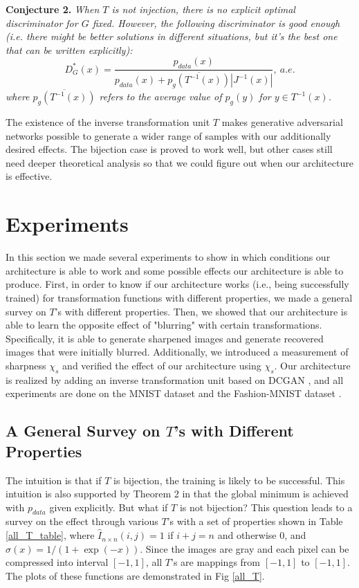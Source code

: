 \documentclass{article}
\begin{document}
\textbf{Conjecture 2.} \emph{When $T$ is not injection, there is no explicit optimal discriminator for $G$ fixed. However, the following discriminator is good enough (i.e. there might be better solutions in different situations, but it's the best one that can be written explicitly):
\begin{equation}D_G^*(x)=\frac{p_{data}(x)}{p_{data}(x)+\overline{p_g(T^{-1}(x))}|J^{-1}(x)|},\ a.e.\end{equation}
where $\overline{p_g(T^{-1}(x))}$ refers to the average value of $p_g(y)$ for $y\in T^{-1}(x)$.}

The existence of the inverse transformation unit $T$ makes generative adversarial networks possible to generate a wider range of samples with our additionally desired effects. The bijection case is proved to work well, but other cases still need deeper theoretical analysis so that we could figure out when our architecture is effective.

\section{Experiments}
In this section we made several experiments to show in which conditions our architecture is able to work and some possible effects our architecture is able to produce. First, in order to know if our architecture works (i.e., being successfully trained) for transformation functions with different properties, we made a general survey on $T$'s with different properties. Then, we showed that our architecture is able to learn the opposite effect of "blurring" with certain transformations. Specifically, it is able to generate sharpened images and generate recovered images that were initially blurred. Additionally, we introduced a measurement of sharpness $\chi_s$ and verified the effect of our architecture using $\chi_s$.
Our architecture is realized by adding an inverse transformation unit based on DCGAN \cite{DCGAN}, and all experiments are done on the MNIST dataset \cite{MNIST} and the Fashion-MNIST dataset \cite{fashion_MNIST}.

\subsection{A General Survey on $T$'s with Different Properties}
The intuition is that if $T$ is bijection, the training is likely to be successful. This intuition is also supported by Theorem 2 in that the global minimum is achieved with $p_{data}$ given explicitly. But what if $T$ is not bijection? This question leads to a survey on the effect through various $T$'s with a set of properties shown in Table \ref{all_T_table}, where  $\hat{I}_{n\times n}(i,j)=1$ if $i+j=n$ and otherwise 0,
and $\sigma(x)=1/(1+\exp(-x))$. Since the images are gray and each pixel can be compressed into interval $[-1,1]$, all $T$'s are mappings from $[-1,1]$ to $[-1,1]$. The plots of these functions are demonstrated in Fig \ref{all_T}.
\end{document}
